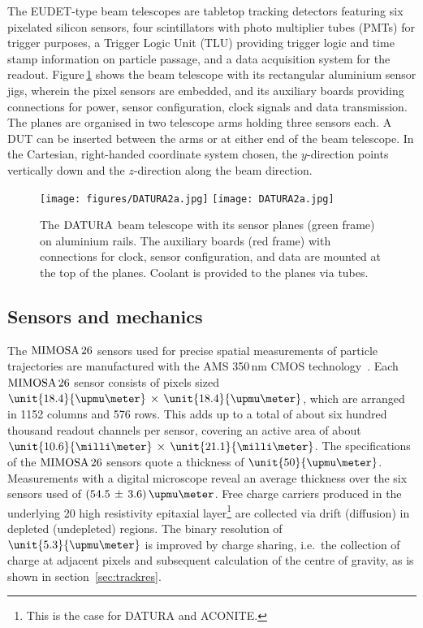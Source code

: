 
The EUDET-type beam telescopes are tabletop tracking detectors featuring six pixelated silicon sensors, four scintillators with photo multiplier tubes (PMTs) for trigger purposes,
 a Trigger Logic Unit (TLU) providing trigger logic and time stamp information on particle passage, and a data acquisition system for the readout. 
Figure\,\ref{fig:datura-tscope} shows the beam telescope with its rectangular aluminium sensor jigs, wherein the pixel sensors are embedded,
 and its auxiliary boards providing connections for power, sensor configuration, clock signals and data transmission. 
The planes are organised in two telescope arms holding three sensors each. 
A DUT can be inserted between the arms or at either end of the beam telescope. 
In the Cartesian, right-handed coordinate system chosen, the $y$-direction points vertically down and the $z$-direction along the beam direction.

\begin{figure}[tb]
	\center
	\ifdefined\notFOREPJ
	\texttt{[image: figures/DATURA2a.jpg]}
	\else
	\texttt{[image: DATURA2a.jpg]}
	\fi
	\caption[The $\Datura$ telescope]{The $\Datura$ beam telescope with its sensor planes (green frame) on aluminium rails.
	The auxiliary boards (red frame) with connections for clock, sensor configuration, and data are mounted at the top of the planes.
	Coolant is provided to the planes via tubes.}
	\label{fig:datura-tscope}
\end{figure}
 
\subsection{Sensors and mechanics}
\label{sec:sensors}

The $\textrm{MIMOSA\,26}$ sensors used for precise spatial measurements of particle trajectories are manufactured with the AMS 350\,nm CMOS technology~\cite{HuGuo2010480}. 
Each $\textrm{MIMOSA\,26}$ sensor consists of pixels sized $\unit{18.4}{\upmu\meter}\,\times\,\unit{18.4}{\upmu\meter}$, which are arranged in 1152 columns and 576 rows.
This adds up to a total of about six hundred thousand readout channels per sensor, covering an active area of about $\unit{10.6}{\milli\meter}\,\times\,\unit{21.1}{\milli\meter}$. 
The specifications of the $\textrm{MIMOSA\,26}$ sensors quote a thickness of $\unit{50}{\upmu\meter}$. 
Measurements with a digital microscope reveal an average thickness over the six sensors used of $(54.5\,\pm\,3.6)\,\upmu\meter$. 
Free charge carriers produced in the underlying \unit{20}{\upmu\meter} high resistivity epitaxial layer\footnote{This is the case for DATURA and ACONITE.} %
 are collected via drift (diffusion) in depleted (undepleted) regions. 
The binary resolution of $\unit{5.3}{\upmu\meter}$ is improved by charge sharing, i.e.\ the collection of charge at adjacent pixels and subsequent calculation of the centre of gravity,
 as is shown in section~\ref{sec:trackres}.

